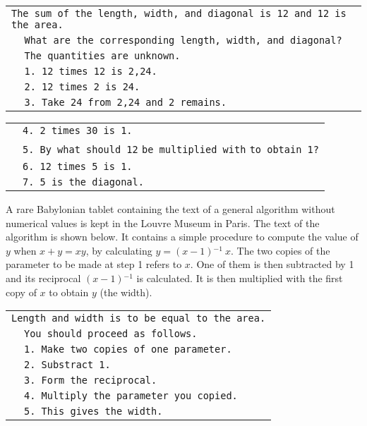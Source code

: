 \medskip
{
\noindent \begin{tabular}{lp{336.0pt}}
\hline
\multicolumn{2}{p{.95\textwidth}}{\texttt{The sum of the length, width, and diagonal is 12 and 12 is the area.}}\\
&\texttt{What are the corresponding length, width, and diagonal?}\\
&\texttt{The quantities are unknown.}\\
&\texttt{1. 12 times 12 is 2,24.}\\
&\texttt{2. 12 times 2 is 24.}\\
&\texttt{3. Take 24 from 2,24 and 2 remains.}
\end{tabular}}

{
\noindent \begin{tabular}{lp{336.0pt}}
&\texttt{4. 2 times 30 is 1.}\\
&\texttt{5. By what should 12} \texttt{be multiplied with} \texttt{to obtain 1?}\\
&\texttt{6. 12 times 5 is 1.}\\
&\texttt{7. 5 is the diagonal.}\\\hline
\end{tabular}}
\medskip

A rare Babylonian tablet containing the text of a general algorithm without numerical values is kept in the Louvre Museum in Paris. The text of the algorithm is shown below. It contains a simple procedure to compute the value of $y$ when $x + y = xy$, by calculating $y = (x - 1)$${}^{-1}\ x$. The two copies of the parameter to be made at step 1 refers to $x$. One of them is then subtracted by 1 and its reciprocal $(x - 1)$${}^{-1}$ is calculated. It is then multiplied with the first copy of $x$ to obtain $y$ (the width).

\medskip
{
\noindent \begin{tabular}{lp{335.0pt}}
\hline
\multicolumn{2}{l}{\texttt{Length and width is to be equal to the area.}}\\
&\texttt{You should proceed as follows.}\\
&\texttt{1. Make two copies of one parameter.}\\
&\texttt{2. Substract 1.}\\
&\texttt{3. Form the reciprocal.}\\
&\texttt{4. Multiply the parameter you copied.}\\
&\texttt{5. This gives the width.}\\ \hline
\end{tabular}}

